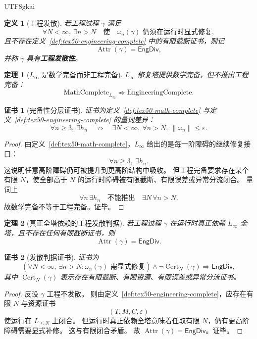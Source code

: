 \documentclass[12pt]{article}
\newtheorem{definition}{定义}[section]
\newtheorem{theorem}{定理}[section]
\newtheorem{Certificate}{证书}[section]
\newcommand{\Linfty}{\ensuremath{L_\infty}}
\newcommand{\Cert}{\operatorname{Cert}}
\newcommand{\Attr}{\operatorname{Attr}}
\newcommand{\EngDiv}{\mathsf{EngDiv}}
\begin{document}
\begin{CJK*}{UTF8}{gkai}
\begin{definition}[工程发散]
\label{def:tex50-engineering-divergence}
若工程过程 $\gamma$ 满足
\[
  \forall N<\infty,\ \exists n>N
  \quad\text{使}\quad
  \omega_n(\gamma)\text{ 仍须在运行时显式修复},
\]
且不存在定义~\ref{def:tex50-engineering-complete} 中的有限截断证书，则记
\[
  \Attr(\gamma)=\EngDiv,
\]
并称 $\gamma$ 具有\textbf{工程发散性}。
\end{definition}

\begin{theorem}[\texorpdfstring{$\Linfty$}{L-infinity} 是数学完备而非工程完备]
\label{thm:tex50-linfty-math-not-eng}
$\Linfty$ 修复塔提供数学完备，但不推出工程完备：
\[
  \text{MathComplete}_{\Linfty}
  \not\Rightarrow
  \text{EngineeringComplete}.
\]
\end{theorem}

\begin{Certificate}[完备性分层证书]
证书为定义~\ref{def:tex50-math-complete} 与定义~\ref{def:tex50-engineering-complete} 的量词差异：
\[
  \forall n\ge3,\ \exists h_n
  \quad\not\Rightarrow\quad
  \exists N<\infty,\ \forall n>N,\ \lVert\omega_n\rVert\le\varepsilon.
\]
\end{Certificate}

\begin{proof}
由定义~\ref{def:tex50-math-complete}，$\Linfty$ 给出的是每一阶障碍的继续修复接口：
\[
  \forall n\ge3,\ \exists h_n.
\]
这说明任意高阶障碍仍可被提升到更高阶结构中吸收。
但工程完备要求存在某个有限 $N$，使全部高于 $N$ 的运行时障碍被有限截断、有限误差或异常分流闭合。
量词上
\[
  \forall n\,\exists h_n
  \quad\text{不能推出}\quad
  \exists N\,\forall n>N.
\]
故数学完备不等于工程完备。证毕。
\end{proof}

\begin{theorem}[真正全塔依赖的工程发散判据]
\label{thm:tex50-runtime-full-tower-divergence}
若工程过程 $\gamma$ 在运行时真正依赖 $\Linfty$ 全塔，且不存在任何有限截断证书，则
\[
  \Attr(\gamma)=\EngDiv.
\]
\end{theorem}

\begin{Certificate}[发散判据证书]
证书为
\[
  \left(
    \forall N<\infty,\ \exists n>N:\omega_n(\gamma)\text{ 需显式修复}
  \right)
  \wedge
  \neg\Cert_N(\gamma)
  \Rightarrow
  \EngDiv,
\]
其中 $\Cert_N(\gamma)$ 表示存在有限截断、有限资源、有限误差或异常分流证书。
\end{Certificate}

\begin{proof}
反设 $\gamma$ 工程不发散。
则由定义~\ref{def:tex50-engineering-complete}，应存在有限 $N$ 与资源证书
\[
  (T,M,C,\varepsilon)
\]
使运行在 $L_{\le N}$ 上闭合。
但运行时真正依赖全塔意味着任取有限 $N$，仍有更高阶障碍需要显式补修。
这与有限闭合矛盾。
故 $\Attr(\gamma)=\EngDiv$。证毕。
\end{proof}


\end{CJK*}
\end{document}
